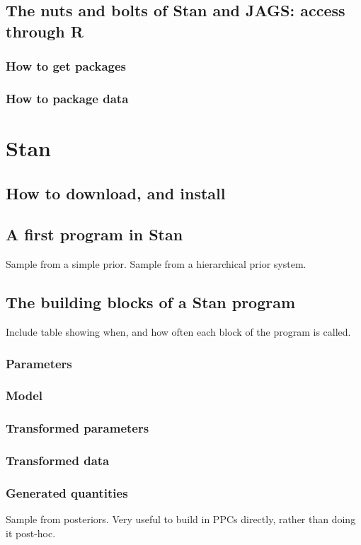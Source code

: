 \documentclass[11pt,fullpage]{book}
\begin{document}
\subsection{The nuts and bolts of Stan and JAGS: access through R}
\subsubsection{How to get packages}
\subsubsection{How to package data}

\section{Stan}
\subsection{How to download, and install}
\subsection{A first program in Stan}
Sample from a simple prior. Sample from a hierarchical prior system.
\subsection{The building blocks of a Stan program}
Include table showing when, and how often each block of the program is called.
\subsubsection{Parameters}
\subsubsection{Model}
\subsubsection{Transformed parameters}
\subsubsection{Transformed data}
\subsubsection{Generated quantities}
Sample from posteriors. Very useful to build in PPCs directly, rather than doing it post-hoc.
\end{document}
